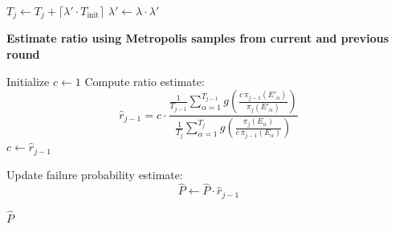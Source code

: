 \begin{algorithm}[t]
\begin{algorithmic}[1]
        \State $T_j \gets T_j + \lceil \lambda' \cdot T_{\text{init}} \rceil$
        \State $\lambda' \gets \lambda \cdot \lambda'$
    \EndIf

\EndWhile

\State \textbf{Estimate ratio using Metropolis samples from current and previous round}

    \State Initialize $c \gets 1$
        \State Compute ratio estimate:
        \[
        \hat{r}_{j-1} = c \cdot 
        \frac{\frac{1}{T_{j-1}}\sum_{\alpha=1}^{T_{j-1}} g\left(\frac{c\,\pi_{j-1}(E'_\alpha)}{\pi_j(E'_\alpha)}\right)}
        {\frac{1}{T_j}\sum_{\alpha=1}^{T_j} g\left(\frac{\pi_j(E_\alpha)}{c\,\pi_{j-1}(E_\alpha)}\right)}
        \]
        \State $c \gets \hat{r}_{j-1}$
    \EndFor

    \State Update failure probability estimate:
    \[
    \hat{P} \gets \hat{P} \cdot \hat{r}_{j-1}
    \]
\EndIf

\EndFor

\State \Return $\hat{P}$

\end{algorithmic}
\end{algorithm}